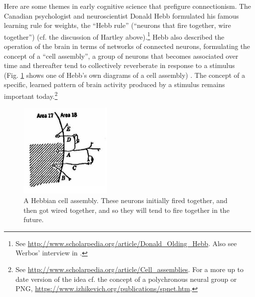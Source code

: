 Here are some themes in early cognitive science that prefigure connectionism. The Canadian psychologist and neuroscientist Donald Hebb formulated his famous learning rule for weights, the ``Hebb rule'' (``neurons that fire together, wire together'') \cite{hebb2005organization} (cf. the discussion of Hartley above).\footnote{See \url{http://www.scholarpedia.org/article/Donald_Olding_Hebb}. Also see Werbos' interview in  \cite{anderson2000talking}.}   Hebb also described the operation of the brain in terms of networks of connected neurons, formulating the concept of a ``cell assembly'', a group of neurons that becomes associated over time and thereafter tend to collectively reverberate in response to a stimulus (Fig. \ref{hebb} shows one of Hebb's own diagrams of a cell assembly) \cite{hebb2005organization}. The concept of a specific, learned pattern of brain activity produced by a stimulus remains important today.\footnote{See \url{http://www.scholarpedia.org/article/Cell_assemblies}. For a more up to date version of the idea cf. the concept of a polychronous neural group or PNG, \url{https://www.izhikevich.org/publications/spnet.htm}.}

\begin{figure}[h]
\centering
\includegraphics[width=0.4\textwidth]{./images/HebbCircuit.png}
\caption[From Hebb, 2005 \cite{hebb2005organization}]{A Hebbian cell assembly. These neurons initially fired together, and then got wired together, and so they will tend to fire together in the future.}
\label{hebb}
\end{figure}

